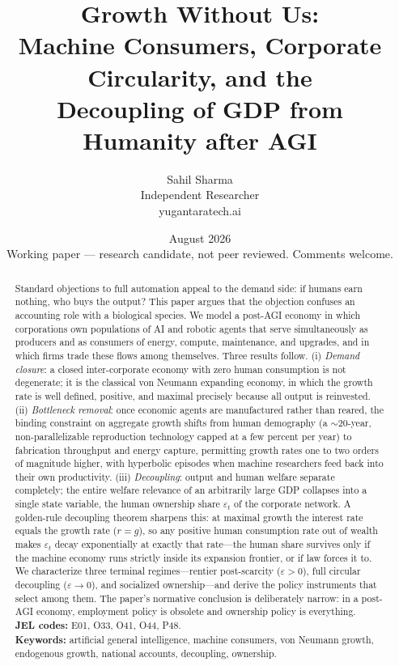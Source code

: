 \documentclass[11pt]{article}
\title{\textbf{Growth Without Us:\\ Machine Consumers, Corporate Circularity, and the\\ Decoupling of GDP from Humanity after AGI}}
\author{Sahil Sharma\\ \small Independent Researcher \\ \small yugantaratech.ai}
\date{August 2026\\[2pt] \small Working paper --- research candidate, not peer reviewed. Comments welcome.}
\newcommand{\eps}{\varepsilon}
\begin{document}
\maketitle

\begin{abstract}
\noindent Standard objections to full automation appeal to the demand side: if humans earn nothing, who buys the output? This paper argues that the objection confuses an accounting role with a biological species. We model a post-AGI economy in which corporations own populations of AI and robotic agents that serve simultaneously as producers and as consumers of energy, compute, maintenance, and upgrades, and in which firms trade these flows among themselves. Three results follow. (i) \emph{Demand closure}: a closed inter-corporate economy with zero human consumption is not degenerate; it is the classical von Neumann expanding economy, in which the growth rate is well defined, positive, and maximal precisely because all output is reinvested. (ii) \emph{Bottleneck removal}: once economic agents are manufactured rather than reared, the binding constraint on aggregate growth shifts from human demography (a $\sim$20-year, non-parallelizable reproduction technology capped at a few percent per year) to fabrication throughput and energy capture, permitting growth rates one to two orders of magnitude higher, with hyperbolic episodes when machine researchers feed back into their own productivity. (iii) \emph{Decoupling}: output and human welfare separate completely; the entire welfare relevance of an arbitrarily large GDP collapses into a single state variable, the human ownership share $\eps_t$ of the corporate network. A golden-rule decoupling theorem sharpens this: at maximal growth the interest rate equals the growth rate ($r=g$), so any positive human consumption rate out of wealth makes $\eps_t$ decay exponentially at exactly that rate---the human share survives only if the machine economy runs strictly inside its expansion frontier, or if law forces it to. We characterize three terminal regimes---rentier post-scarcity ($\eps>0$), full circular decoupling ($\eps\to 0$), and socialized ownership---and derive the policy instruments that select among them. The paper's normative conclusion is deliberately narrow: in a post-AGI economy, employment policy is obsolete and ownership policy is everything.
\\[6pt]
\noindent\textbf{JEL codes:} E01, O33, O41, O44, P48.\\
\textbf{Keywords:} artificial general intelligence, machine consumers, von Neumann growth, endogenous growth, national accounts, decoupling, ownership.
\end{abstract}
\end{document}
